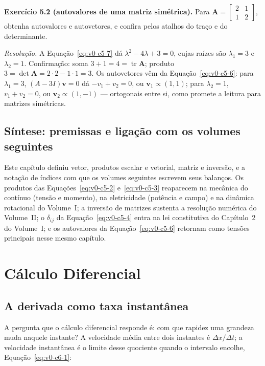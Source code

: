 \documentclass[12pt,a4paper]{article}
\numberwithin{equation}{section}
\numberwithin{table}{section}
\numberwithin{figure}{section}
\begin{document}
\textbf{Exercício 5.2 (autovalores de uma matriz simétrica).} Para
$\bm{A} = \begin{bmatrix} 2 & 1 \\ 1 & 2 \end{bmatrix}$, obtenha
autovalores e autovetores, e confira pelos atalhos do traço e do
determinante.

\emph{Resolução.} A Equação~\eqref{eq:v0-c5-7} dá
$\lambda^2 - 4\lambda + 3 = 0$, cujas raízes são $\lambda_1 = 3$ e
$\lambda_2 = 1$. Confirmação: soma $3+1 = 4 = \operatorname{tr}\bm{A}$;
produto $3 = \det\bm{A} = 2\cdot 2 - 1\cdot 1 = 3$. Os autovetores vêm da
Equação~\eqref{eq:v0-c5-6}: para $\lambda_1 = 3$, $(A - 3I)\bm{v} = 0$ dá
$-v_1 + v_2 = 0$, ou $\bm{v}_1 \propto (1,1)$; para $\lambda_2 = 1$,
$v_1 + v_2 = 0$, ou $\bm{v}_2 \propto (1,-1)$ --- ortogonais entre si,
como promete a leitura para matrizes simétricas.

\subsection{Síntese: premissas e ligação com os volumes seguintes}

Este capítulo definiu vetor, produtos escalar e vetorial, matriz e
inversão, e a notação de índices com que os volumes seguintes escrevem
seus balanços. Os produtos das Equações~\eqref{eq:v0-c5-2}
e~\eqref{eq:v0-c5-3} reaparecem na mecânica do contínuo (tensão e
momento), na eletricidade (potência e campo) e na dinâmica rotacional do
Volume~I; a inversão de matrizes sustenta a resolução numérica do
Volume~II; o $\delta_{ij}$ da Equação~\eqref{eq:v0-c5-4} entra na lei
constitutiva do Capítulo~2 do Volume~I; e os autovalores da
Equação~\eqref{eq:v0-c5-6} retornam como tensões principais nesse mesmo
capítulo.


\clearpage
\section{Cálculo Diferencial}\label{sec:v0-derivadas}

\subsection{A derivada como taxa instantânea}

A pergunta que o cálculo diferencial responde é: com que rapidez uma
grandeza muda naquele instante? A velocidade média entre dois instantes é
$\Delta x / \Delta t$; a velocidade instantânea é o limite desse quociente
quando o intervalo encolhe, Equação~\eqref{eq:v0-c6-1}:
\end{document}

